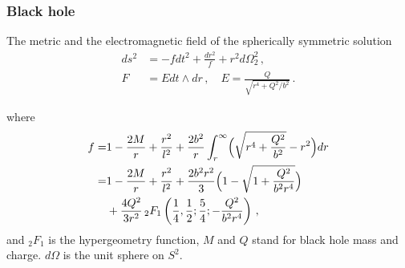 
\begin{frame}
\frametitle{\textbf{Black hole}}
\begin{exampleblock}{The metric and the electromagnetic field of the spherically symmetric solution}
\begin{align}
    ds^2&=-fdt^2+\frac{dr^2}{f}+r^2 d\Omega_2^2\,,\label{BImetric}\\
    F&=Edt\wedge dr\label{BIE}\,, \quad E=\frac{Q}{\sqrt{r^4+Q^2/b^2}}\,.
\end{align}
\end{exampleblock}
where
\begin{equation}
\begin{split}
    f=&1-\frac{2M}{r}+\frac{r^2}{l^2}+\frac{2b^2}{r}\int_r^\infty \Bigl(\sqrt{r^4+\frac{Q^2}{b^2}}-r^2\Bigr)dr\nonumber\\
    =&1-\frac{2M}{r}+\frac{r^2}{l^2}+\frac{2b^2 r^2}{3}\Bigl(1-\sqrt{1+\frac{Q^2}{b^2 r^4}}\Bigr)\nonumber\\
    &+\frac{4Q^2}{3r^2}\,{}_2 F_1\left(\frac{1}{4},\frac{1}{2}; \frac{5}{4};-\frac{Q^2}{b^2 r^4}\right)\,,
\end{split}
\end{equation}
and $_2 F_1$ is the hypergeometry function, $M$ and $Q$ stand for black hole mass and charge. $d\Omega$ is the unit sphere on $S^2$.
\end{frame}

